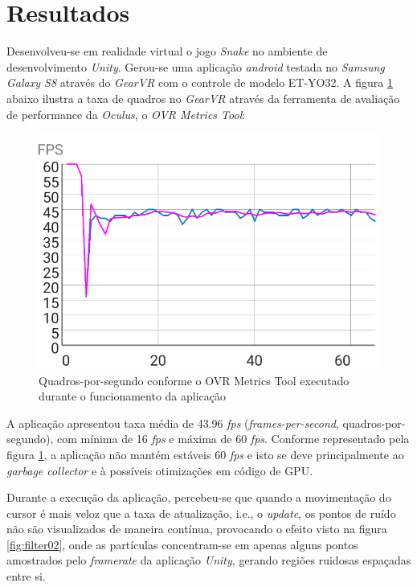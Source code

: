 \documentclass{vgtc}                          %
\begin{document}
\section{Resultados} \label{sec:results}

Desenvolveu-se em realidade virtual o jogo \textit{Snake} no ambiente de desenvolvimento \textit{Unity}. Gerou-se uma aplicação \textit{android} testada no \textit{Samsung Galaxy S8} através do \textit{GearVR} com o controle de modelo ET-YO32. A figura \ref{fig:VRPerformanceChart} abaixo ilustra a taxa de quadros no \textit{GearVR} através da ferramenta de avaliação de performance da \textit{Oculus}, o \textit{OVR Metrics Tool}:

\begin{figure}[h!]
\centering
\includegraphics[width=\linewidth]{VRPerformance}
\caption{Quadros-por-segundo conforme o OVR Metrics Tool executado durante o funcionamento da aplicação }
\label{fig:VRPerformanceChart}
\end{figure}

A aplicação apresentou taxa média de 43.96 \textit{fps} (\textit{frames-per-second}, quadros-por-segundo), com mínima de 16 \textit{fps} e máxima de 60 \textit{fps}. Conforme representado pela figura \ref{fig:VRPerformanceChart}, a aplicação não mantém estáveis 60 \textit{fps} e isto se deve principalmente ao \textit{garbage collector} e à possíveis otimizações em código de GPU.

Durante a execução da aplicação, percebeu-se que quando a movimentação do cursor é mais veloz que a taxa de atualização, i.e., o \textit{update}, os pontos de ruído não são visualizados de maneira contínua, provocando o efeito visto na figura \ref{fig:filter02}, onde as partículas concentram-se em apenas alguns pontos amostrados pelo \textit{framerate} da aplicação \textit{Unity}, gerando regiões ruidosas espaçadas entre si.
\end{document}
